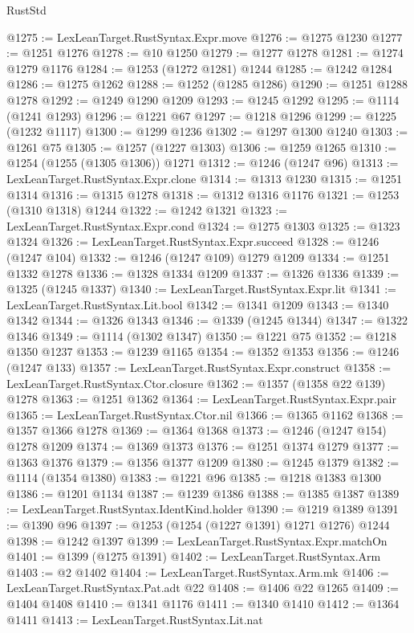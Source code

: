 \begin{lexlean}{RustStd}
\begin{coremodule}
@1275 := LexLeanTarget.RustSyntax.Expr.move
@1276 := @1275 @1230
@1277 := @1251 @1276
@1278 := @10 @1250
@1279 := @1277 @1278
@1281 := @1274 @1279 @1176
@1284 := @1253 (@1272 @1281) @1244
@1285 := @1242 @1284
@1286 := @1275 @1262
@1288 := @1252 (@1285 @1286)
@1290 := @1251 @1288 @1278
@1292 := @1249 @1290 @1209
@1293 := @1245 @1292
@1295 := @1114 (@1241 @1293)
@1296 := @1221 @67
@1297 := @1218 @1296
@1299 := @1225 (@1232 @1117)
@1300 := @1299 @1236
@1302 := @1297 @1300 @1240
@1303 := @1261 @75
@1305 := @1257 (@1227 @1303)
@1306 := @1259 @1265
@1310 := @1254 (@1255 (@1305 @1306)) @1271
@1312 := @1246 (@1247 @96)
@1313 := LexLeanTarget.RustSyntax.Expr.clone
@1314 := @1313 @1230
@1315 := @1251 @1314
@1316 := @1315 @1278
@1318 := @1312 @1316 @1176
@1321 := @1253 (@1310 @1318) @1244
@1322 := @1242 @1321
@1323 := LexLeanTarget.RustSyntax.Expr.cond
@1324 := @1275 @1303
@1325 := @1323 @1324
@1326 := LexLeanTarget.RustSyntax.Expr.succeed
@1328 := @1246 (@1247 @104)
@1332 := @1246 (@1247 @109) @1279 @1209
@1334 := @1251 @1332 @1278
@1336 := @1328 @1334 @1209
@1337 := @1326 @1336
@1339 := @1325 (@1245 @1337)
@1340 := LexLeanTarget.RustSyntax.Expr.lit
@1341 := LexLeanTarget.RustSyntax.Lit.bool
@1342 := @1341 @1209
@1343 := @1340 @1342
@1344 := @1326 @1343
@1346 := @1339 (@1245 @1344)
@1347 := @1322 @1346
@1349 := @1114 (@1302 @1347)
@1350 := @1221 @75
@1352 := @1218 @1350 @1237
@1353 := @1239 @1165
@1354 := @1352 @1353
@1356 := @1246 (@1247 @133)
@1357 := LexLeanTarget.RustSyntax.Expr.construct
@1358 := LexLeanTarget.RustSyntax.Ctor.closure
@1362 := @1357 (@1358 @22 @139) @1278
@1363 := @1251 @1362
@1364 := LexLeanTarget.RustSyntax.Expr.pair
@1365 := LexLeanTarget.RustSyntax.Ctor.nil
@1366 := @1365 @1162
@1368 := @1357 @1366 @1278
@1369 := @1364 @1368
@1373 := @1246 (@1247 @154) @1278 @1209
@1374 := @1369 @1373
@1376 := @1251 @1374 @1279
@1377 := @1363 @1376
@1379 := @1356 @1377 @1209
@1380 := @1245 @1379
@1382 := @1114 (@1354 @1380)
@1383 := @1221 @96
@1385 := @1218 @1383 @1300
@1386 := @1201 @1134
@1387 := @1239 @1386
@1388 := @1385 @1387
@1389 := LexLeanTarget.RustSyntax.IdentKind.holder
@1390 := @1219 @1389
@1391 := @1390 @96
@1397 := @1253 (@1254 (@1227 @1391) @1271 @1276) @1244
@1398 := @1242 @1397
@1399 := LexLeanTarget.RustSyntax.Expr.matchOn
@1401 := @1399 (@1275 @1391)
@1402 := LexLeanTarget.RustSyntax.Arm
@1403 := @2 @1402
@1404 := LexLeanTarget.RustSyntax.Arm.mk
@1406 := LexLeanTarget.RustSyntax.Pat.adt @22
@1408 := @1406 @22 @1265
@1409 := @1404 @1408
@1410 := @1341 @1176
@1411 := @1340 @1410
@1412 := @1364 @1411
@1413 := LexLeanTarget.RustSyntax.Lit.nat

\end{coremodule}
\end{lexlean}
